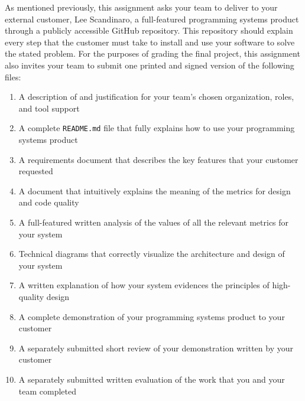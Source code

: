 As mentioned previously, this assignment asks your team to deliver to your external customer, Lee Scandinaro, a
full-featured programming systems product through a publicly accessible GitHub repository. This repository should
explain every step that the customer must take to install and use your software to solve the stated problem. For the
purposes of grading the final project, this assignment also invites your team to submit one printed and signed version
of the following files:

\vspace*{-.1in}
\begin{enumerate}
  \itemsep0em
  \item A description of and justification for your team's chosen organization, roles, and tool support
  \item A complete {\tt README.md} file that fully explains how to use your programming systems product
  \item A requirements document that describes the key features that your customer requested
  \item A document that intuitively explains the meaning of the metrics for design and code quality
  \item A full-featured written analysis of the values of all the relevant metrics for your system
  \item Technical diagrams that correctly visualize the architecture and design of your system
  \item A written explanation of how your system evidences the principles of high-quality design
  \item A complete demonstration of your programming systems product to your customer
  \item A separately submitted short review of your demonstration written by your customer
  \item A separately submitted written evaluation of the work that you and your team completed
\end{enumerate}
\vspace*{-.1in}


